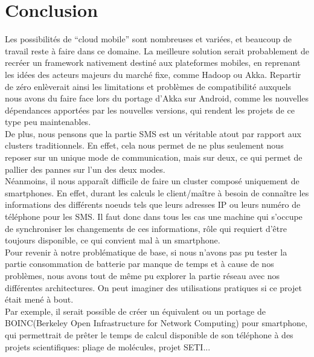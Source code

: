 \documentclass[a4paper,12pt]{article}
\begin{document}

\section*{Conclusion}
Les possibilités de “cloud mobile” sont nombreuses et variées, et beaucoup de
travail reste à faire dans ce domaine. La meilleure solution serait
probablement de recréer un framework nativement destiné aux plateformes
mobiles, en reprenant les idées des acteurs majeurs du marché fixe, comme
Hadoop ou Akka. Repartir de zéro enlèverait ainsi les limitations et problèmes
de compatibilité auxquels nous avons du faire face lors du portage d’Akka sur
Android, comme les nouvelles dépendances apportées par les nouvelles versions,
qui rendent les projets de ce type peu maintenables.\\ De plus, nous pensons
que la partie SMS est un véritable atout par rapport aux clusters
traditionnels. En effet, cela nous permet de ne plus seulement nous reposer sur
un unique mode de communication, mais sur deux, ce qui permet de pallier des
pannes sur l’un des deux modes.\\ Néanmoins, il nous apparaît difficile de
faire un cluster composé uniquement de smartphones. En effet, durant les
calculs le client/maître à besoin de connaître les informations des différents
noeuds tels que leurs adresses IP ou leurs numéro de téléphone pour les SMS. Il
faut donc dans tous les cas une machine qui s’occupe de synchroniser les
changements de ces informations, rôle qui requiert d’être toujours disponible,
ce qui convient mal à un smartphone.\\ 

Pour revenir à notre problématique de base, si nous n’avons pas pu tester la
partie consommation de batterie par manque de temps et à cause de nos
problèmes, nous avons tout de même pu explorer la partie réseau avec nos
différentes architectures. On peut imaginer des utilisations pratiques si ce
projet était mené à bout.\\ Par exemple, il serait possible de créer un
équivalent ou un portage de BOINC(Berkeley Open Infrastructure for Network
Computing) pour smartphone, qui permettrait de prêter le temps de calcul
disponible de son téléphone à des projets scientifiques: pliage de molécules,
projet SETI...
\end{document}
